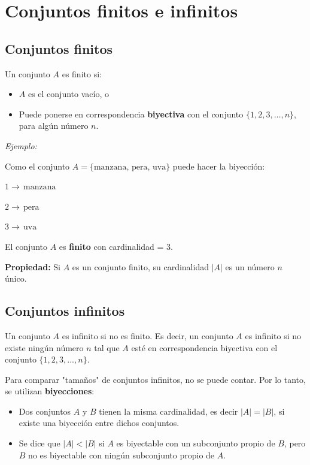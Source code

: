 \documentclass{article}
\begin{document}
\section{Conjuntos finitos e infinitos}

\subsection{Conjuntos finitos}

Un conjunto $A$ es finito si:

\begin{itemize}
    \item $A$ es el conjunto vacío, o
    \item Puede ponerse en correspondencia \textbf{biyectiva} con el conjunto $\{1, 2, 3, \dots, n\}$, para algún número $n$.
\end{itemize}

\textit{Ejemplo:}

Como el conjunto $A = \{\text{manzana}, \, \text{pera}, \, \text{uva}\}$ puede hacer la biyección:

$1 \to \, \text{manzana}$

$2 \to \, \text{pera}$

$3 \to \, \text{uva}$

El conjunto $A$ es \textbf{finito} con cardinalidad = $3$.

\textbf{Propiedad:} Si $A$ es un conjunto finito, su cardinalidad $\left|A\right|$ es un número $n$ único.

\subsection{Conjuntos infinitos}

Un conjunto $A$ es infinito si no es finito. Es decir, un conjunto $A$ es infinito si no existe ningún número $n$ tal que $A$ esté en correspondencia biyectiva con el conjunto $\{1, 2, 3, ..., n\}$.

Para comparar "tamaños" de conjuntos infinitos, no se puede contar. Por lo tanto, se utilizan \textbf{biyecciones}:

\begin{itemize}
    \item Dos conjuntos $A$ y $B$ tienen la misma cardinalidad, es decir $\left|A\right| = \left|B\right|$, si existe una biyección entre dichos conjuntos.
    \item Se dice que $\left|A\right| < \left|B\right|$ si $A$ es biyectable con un subconjunto propio de $B$, pero $B$ no es biyectable con ningún subconjunto propio de $A$.
\end{itemize}
\end{document}

